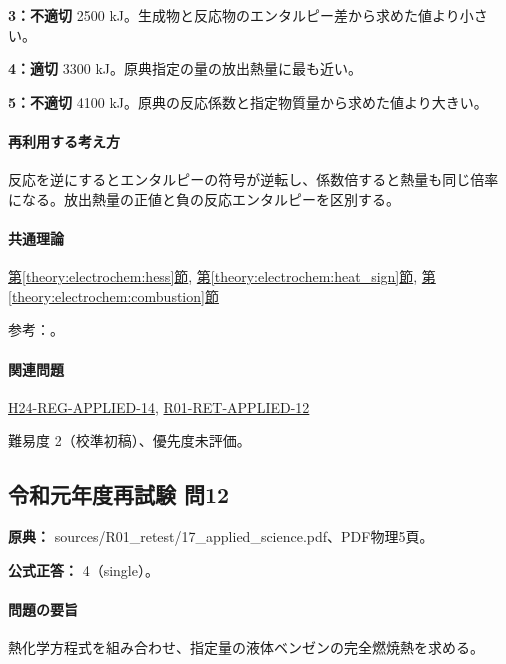 \noindent\textbf{3：不適切} 2500 kJ。生成物と反応物のエンタルピー差から求めた値より小さい。\par

\noindent\textbf{4：適切} 3300 kJ。原典指定の量の放出熱量に最も近い。\par

\noindent\textbf{5：不適切} 4100 kJ。原典の反応係数と指定物質量から求めた値より大きい。\par

\paragraph{再利用する考え方} 反応を逆にするとエンタルピーの符号が逆転し、係数倍すると熱量も同じ倍率になる。放出熱量の正値と負の反応エンタルピーを区別する。

\paragraph{共通理論} \hyperref[theory:electrochem:hess]{第\ref*{theory:electrochem:hess}節}, \hyperref[theory:electrochem:heat_sign]{第\ref*{theory:electrochem:heat_sign}節}, \hyperref[theory:electrochem:combustion]{第\ref*{theory:electrochem:combustion}節}

\par 参考：\cite{openstax_hess}。

\paragraph{関連問題} \hyperref[q:h24-reg-applied-14]{H24-REG-APPLIED-14}, \hyperref[q:r01-ret-applied-12]{R01-RET-APPLIED-12}

\par 難易度 2（校準初稿）、優先度未評価。

\subsection{令和元年度再試験 問12}
\label{q:r01-ret-applied-12}

\noindent\textbf{原典：} sources/R01\_retest/17\_applied\_science.pdf、PDF物理5頁。

\textbf{公式正答：} 4（single）。

\paragraph{問題の要旨} 熱化学方程式を組み合わせ、指定量の液体ベンゼンの完全燃焼熱を求める。

